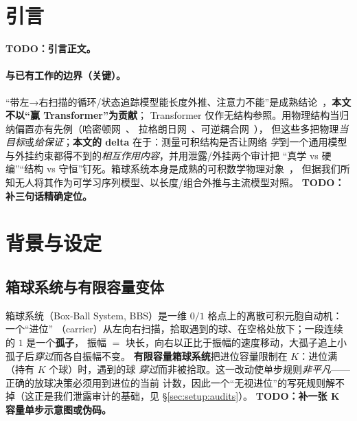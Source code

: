 \documentclass[11pt]{article}
\begin{document}

\section{引言}\label{sec:intro}

\textbf{TODO：引言正文。}

\paragraph{与已有工作的边界（关键）。}
“带左→右扫描的循环/状态追踪模型能长度外推、注意力不能”是成熟结论~\citep{liu2023transformers,
merrill2023parallelism, merrill2024illusion}，\textbf{本文不以“赢 Transformer”为贡献}；
Transformer 仅作无结构参照。用物理结构当归纳偏置亦有先例（哈密顿网~\citep{greydanus2019hamiltonian}、
拉格朗日网~\citep{cranmer2020lagrangian}、可逆耦合网~\citep{dinh2014nice, dinh2016density}），
但这些多把物理\emph{当目标}或\emph{给保证}；\textbf{本文的 delta} 在于：测量可积结构是否让网络
\emph{学}到一个通用模型与外挂约束都得不到的\emph{相互作用内容}，并用泄露/外挂两个审计把
“真学 vs 硬编”“结构 vs 守恒”钉死。箱球系统本身是成熟的可积数学物理对象~\citep{takahashi1990soliton}，
但据我们所知无人将其作为可学习序列模型、以长度/组合外推与主流模型对照。
\textbf{TODO：补三句话精确定位。}

\section{背景与设定}\label{sec:setup}

\subsection{箱球系统与有限容量变体}\label{sec:setup:bbs}
箱球系统（Box-Ball System, BBS）是一维 $0/1$ 格点上的离散可积元胞自动机：一个“进位”
（carrier）从左向右扫描，拾取遇到的球、在空格处放下；一段连续的 $1$ 是一个\textbf{孤子}，
振幅 $=$ 块长，向右以正比于振幅的速度移动，大孤子追上小孤子后\emph{穿过}而各自振幅不变。
\textbf{有限容量箱球系统}把进位容量限制在 $K$：进位满（持有 $K$ 个球）时，遇到的球
\emph{穿过}而非被拾取。这一改动使单步规则\emph{非平凡}——正确的放球决策必须用到进位的当前
计数，因此一个“无视进位”的写死规则解不掉（这正是我们泄露审计的基础，见 \S\ref{sec:setup:audits}）。
\textbf{TODO：补一张 K 容量单步示意图或伪码。}
\end{document}
